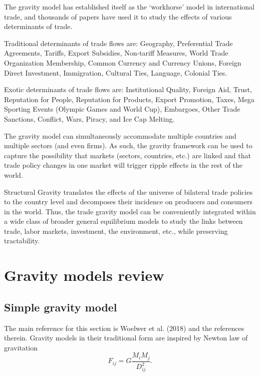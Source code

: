 \documentclass[12pt,reqno,oneside,pdftex]{formato-puc/puctesis} %
\begin{document}
The gravity model has established itself as the `workhorse' model in
international trade, and thousands of papers have used it to study the
effects of various determinants of trade.

Traditional determinants of trade flows are: Geography, Preferential
Trade Agreements, Tariffs, Export Subsidies, Non-tariff Measures, World
Trade Organization Membership, Common Currency and Currency Unions,
Foreign Direct Investment, Immigration, Cultural Ties, Language,
Colonial Ties.

Exotic determinants of trade flows are: Institutional Quality, Foreign
Aid, Trust, Reputation for People, Reputation for Products, Export
Promotion, Taxes, Mega Sporting Events (Olympic Games and World Cup),
Embargoes, Other Trade Sanctions, Conflict, Wars, Piracy, and Ice Cap
Melting.

The gravity model can simultaneously accommodate multiple countries and
multiple sectors (and even firms). As such, the gravity framework can be
used to capture the possibility that markets (sectors, countries, etc.)
are linked and that trade policy changes in one market will trigger
ripple effects in the rest of the world.

Structural Gravity translates the effects of the universe of bilateral
trade policies to the country level and decomposes their incidence on
producers and consumers in the world. Thus, the trade gravity model can
be conveniently integrated within a wide class of broader general
equilibrium models to study the links between trade, labor markets,
investment, the environment, etc., while preserving tractability.

\hypertarget{gravity-models-review}{%
\section{Gravity models review}\label{gravity-models-review}}

\hypertarget{simple-gravity-model}{%
\subsection{Simple gravity model}\label{simple-gravity-model}}

The main reference for this section is Woelwer et al. (2018) and the
references therein. Gravity models in their traditional form are
inspired by Newton law of gravitation \begin{equation*}
F_{ij}=G\frac{M_{i}M_{j}}{D^{2}_{ij}}.
\end{equation*}
\end{document}
